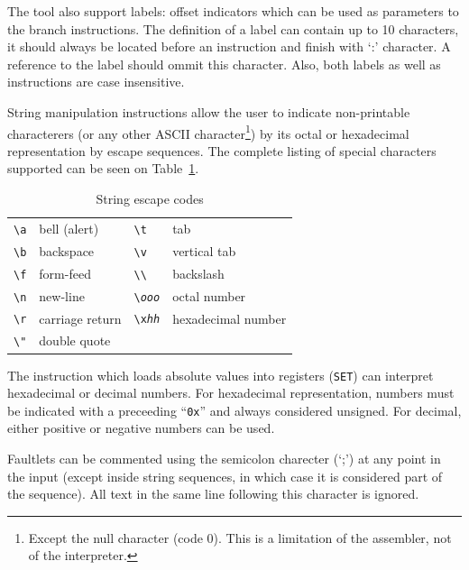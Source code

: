 \documentclass[11pt]{article}
\begin{document}
The tool also support labels: offset indicators which can be used as parameters to the branch instructions. The definition of a label can contain up to 10 characters, it should always be located before an instruction and finish with `:' character. A reference to the label should ommit this character. Also, both labels as well as instructions are case insensitive.

String manipulation instructions allow the user to indicate non-printable characterers (or any other ASCII character\footnote{Except the null character (code 0). This is a limitation of the assembler, not of the interpreter.}) by its octal or hexadecimal representation by escape sequences. The complete listing of special characters supported can be seen on Table~\ref{tab:escape}.


\begin{table}[htbp]
  \centering
  \caption{String escape codes}
  \begin{tabular}{lp{4cm}lp{4cm}}
    \hline
    \texttt{\textbackslash a} & bell (alert) & \texttt{\textbackslash t} & tab \\
    \texttt{\textbackslash b} & backspace & \texttt{\textbackslash v} & vertical tab \\
    \texttt{\textbackslash f} & form-feed & \texttt{\textbackslash \textbackslash} & backslash \\
    \texttt{\textbackslash n} & new-line & \texttt{\textbackslash {\em ooo}} & octal number \\
    \texttt{\textbackslash r} & carriage return & \texttt{\textbackslash x{\em hh}} & hexadecimal number \\
\texttt{\textbackslash "} & double quote \\
    \hline
  \end{tabular}

  \label{tab:escape}
\end{table}


The instruction which loads absolute values into registers (\texttt{SET}) can interpret hexadecimal or decimal numbers. For hexadecimal representation, numbers must be indicated with a preceeding ``\texttt{0x}'' and always considered unsigned. For decimal, either positive or negative numbers can be used.


Faultlets can be commented using the semicolon charecter (`;') at any point in the input (except inside string sequences, in which case it is considered part of the sequence). All text in the same line following this character is ignored.
\end{document}
